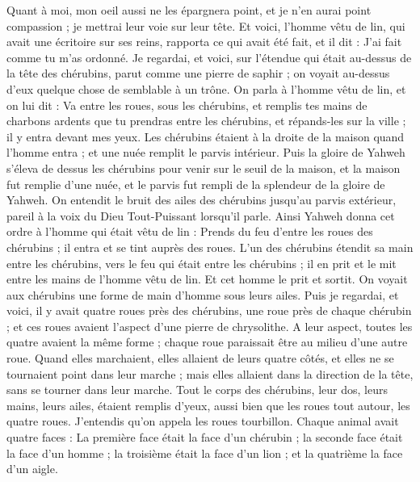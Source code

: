 \begin{multicols}{2}
Quant à moi, mon oeil aussi ne les épargnera point, et je n'en aurai point compassion ; je mettrai leur voie sur leur tête.
Et voici, l'homme vêtu de lin, qui avait une écritoire sur ses reins, rapporta ce qui avait été fait, et il dit : J'ai fait comme tu m'as ordonné.
\VerseOne{}Je regardai, et voici, sur l'étendue qui était au-dessus de la tête des chérubins, parut comme une pierre de saphir ; on voyait au-dessus d'eux quelque chose de semblable à un trône.
On parla à l'homme vêtu de lin, et on lui dit : Va entre les roues, sous les chérubins, et remplis tes mains de charbons ardents que tu prendras entre les chérubins, et répands-les sur la ville ; il y entra devant mes yeux.
Les chérubins étaient à la droite de la maison quand l'homme entra ; et une nuée remplit le parvis intérieur.
Puis la gloire de Yahweh s'éleva de dessus les chérubins pour venir sur le seuil de la maison, et la maison fut remplie d'une nuée, et le parvis fut rempli de la splendeur de la gloire de Yahweh.
On entendit le bruit des ailes des chérubins jusqu'au parvis extérieur, pareil à la voix du Dieu Tout-Puissant lorsqu'il parle.
Ainsi Yahweh donna cet ordre à l'homme qui était vêtu de lin : Prends du feu d'entre les roues des chérubins ; il entra et se tint auprès des roues.
L'un des chérubins étendit sa main entre les chérubins, vers le feu qui était entre les chérubins ; il en prit et le mit entre les mains de l'homme vêtu de lin. Et cet homme le prit et sortit.
On voyait aux chérubins une forme de main d'homme sous leurs ailes.
Puis je regardai, et voici, il y avait quatre roues près des chérubins, une roue près de chaque chérubin ; et ces roues avaient l'aspect d'une pierre de chrysolithe.
A leur aspect, toutes les quatre avaient la même forme ; chaque roue paraissait être au milieu d'une autre roue.
Quand elles marchaient, elles allaient de leurs quatre côtés, et elles ne se tournaient point dans leur marche ; mais elles allaient dans la direction de la tête, sans se tourner dans leur marche.
Tout le corps des chérubins, leur dos, leurs mains, leurs ailes, étaient remplis d'yeux, aussi bien que les roues tout autour, les quatre roues.
J'entendis qu'on appela les roues tourbillon.
Chaque animal avait quatre faces : La première face était la face d'un chérubin ; la seconde face était la face d'un homme ; la troisième était la face d'un lion ; et la quatrième la face d'un aigle.

\end{multicols}
